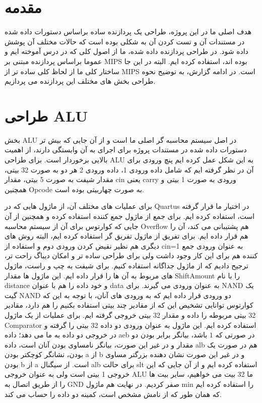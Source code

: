 \documentclass[12pt,titlepage,a4page , tikz , multi,table , svgnames,xcdraw]{article}
\begin{document}
\newpage
\pagestyle{fancy}
\fancyhf{}
\fancyfoot{}

\cfoot{\thepage}



\newpage

\section{مقدمه}

هدف اصلی ما در این پروژه، طراحی یک پردازنده ساده براساس دستورات داده شده در مستندات آن و تست کردن آن به شکلی بوده است که حالات مختلف آن پوشش داده شود. در طراحی پردازنده داده شده، ما از اصول کلی که در درس آموخته ایم و عموما براساس پردازنده مبتنی بر MIPS بوده اند، استفاده کرده ایم. البته در این جا ساختار کلی ما از لحاظ کلی ساده تر از MIPS است. در ادامه گزارش، به توضیح نحوه طراحی بخش های مختلف این پردازنده می پردازیم.

\newpage

\section{طراحی ALU}

بخش ALU در اصل سیستم محاسبه گر اصلی ما است و از آن جایی که بیش تر دستورات داده شده در مستندات پروژه برای اجرای به آن وابستگی دارند، از اهمیت بالایی برخوردار است. برای طراحی ALU به این شکل عمل کرده ایم پنچ ورودی برای آن در نظر گرفته ایم که شامل داده ورودی 1، داده ورودی 2 هر دو به صورت 32 بیتی، مقدار شیفت به صورت 5 بیتی، مقدار cin یعنی carry ورودی به صورت 1 بیتی و همچنین Opcode به صورت چهاربیتی بوده است. 

برای عملیات های مختلف آن، از ماژول هایی که در Quartus در اختیار ما قرار گرفته است، استفاده کرده ایم. برای جمع از ماژول جمع کننده استفاده کرده و همچنین از آن جایی که کوارتوس برای آن از سیستم محاسبه Overflow هم پشتیبانی می کند، آن را هم قرار داده ایم. برای تفریق از ماژول تفریق گر استفاده کرده ایم، البته روش های دیگری هم نظیر نقیض کردن ورودی دوم و استفاده از cin=1 به عنوان ورودی جمع کننده هم برای این کار وجود داشت ولی برای طراحی ساده تر و امکان دیباگ راحت تر، ترجیح دادیم که از ماژول جداگانه استفاده کنیم. برای شیفت به چپ و راست، ماژول های مربوط به آن ها را قرار داده ایم. این ماژول ها مقدار ShiftAmount را با نام distance و خود داده را هم با عنوان data به عنوان ورودی می گیرند. برای NAND یک گیت NAND دو ورودی قرار داده ایم که به ورودی های آنان، با توجه به این که کوارتوس توانایی تشخیص این که از مقادیر چند بیتی استفاده بکنیم را هم دارد، مقادیر 32 بیتی مربوطه را داده و مقدار 32 بیتی خروجی گرفته ایم. برای عملیات  از یک ماژول Comparator استفاده کرده ایم. این ماژول به عنوان ورودی دو داده 32 بیتی را گرفته و در خروجی دو داده به ما می دهد؛ داده aeb در صورتی که $1$ باشد، بیانگر برابر بودن دو مقدار و در غیر این صورت، بیانگر نامساوی بودن آنان است، داده alb هم در صورت یک بودن، نشانگر کوچکتر بودن a از b و در غیر این صورت نشان دهنده بزرگتر مساوی بودن b از a است. از سیگنال alb برای حالت slt استفاده کرده ایم و از آن جایی که این خروجی 1 بیتی است ولی به عنوان خروجی ALU ما 32 بیت می خواهیم، سایر بیت ها را از طریق اتصال به GND صفر کردیم. در نهایت هم ماژول min را استفاده کرده ایم که همان طور که از نامش مشخص است، کمینه دو داده را حساب می کند.
\end{document}
